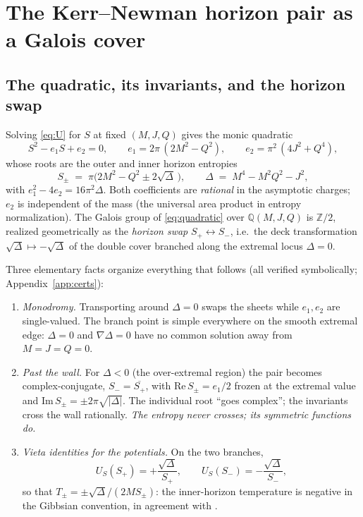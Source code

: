 \documentclass[11pt]{article}
\theoremstyle{definition}
\theoremstyle{remark}
\newcommand{\Q}{\mathbb{Q}}
\newcommand{\ZZ}{\mathbb{Z}}
\newcommand{\disc}{\Delta}
\begin{document}
\section{The Kerr--Newman horizon pair as a Galois cover}
\label{sec:KN}

\subsection{The quadratic, its invariants, and the horizon swap}

Solving \eqref{eq:U} for $S$ at fixed $(M,J,Q)$ gives the monic quadratic
\begin{equation}
S^2 - e_1 S + e_2 = 0,\qquad
e_1 = 2\pi\,(2M^2-Q^2),\qquad
e_2 = \pi^2\,(4J^2+Q^4),
\label{eq:quadratic}
\end{equation}
whose roots are the outer and inner horizon entropies
\begin{equation}
S_\pm \;=\; \pi\bigl(2M^2-Q^2 \pm 2\sqrt{\disc}\,\bigr),
\qquad \disc \;=\; M^4 - M^2Q^2 - J^2 ,
\end{equation}
with $e_1^2-4e_2 = 16\pi^2\disc$. Both coefficients are \emph{rational} in the
asymptotic charges; $e_2$ is independent of the mass (the universal area
product \cite{AH,CGP2011} in entropy normalization). The Galois group of
\eqref{eq:quadratic} over $\Q(M,J,Q)$ is $\ZZ/2$, realized geometrically as the
\emph{horizon swap} $S_+\leftrightarrow S_-$, i.e.\ the deck transformation
$\sqrt{\disc}\mapsto-\sqrt{\disc}$ of the double cover branched along the
extremal locus $\disc=0$.

Three elementary facts organize everything that follows (all verified
symbolically; Appendix~\ref{app:certs}):
\begin{enumerate}
\item \emph{Monodromy.} Transporting around $\disc=0$ swaps the sheets while
$e_1,e_2$ are single-valued. The branch point is simple everywhere on the
smooth extremal edge: $\disc=0$ and $\nabla\disc=0$ have no common solution
away from $M=J=Q=0$.
\item \emph{Past the wall.} For $\disc<0$ (the over-extremal region) the pair
becomes complex-conjugate, $S_-=\overline{S_+}$, with
$\mathrm{Re}\,S_\pm=e_1/2$ frozen at the extremal value and
$\mathrm{Im}\,S_\pm=\pm 2\pi\sqrt{|\disc|}$. The individual root
``goes complex''; the invariants cross the wall rationally. \emph{The entropy
never crosses; its symmetric functions do.}
\item \emph{Vieta identities for the potentials.} On the two branches,
\begin{equation}
U_S(S_+)=+\frac{\sqrt\disc}{S_+},\qquad
U_S(S_-)=-\frac{\sqrt\disc}{S_-},
\end{equation}
so that $T_\pm = \pm\sqrt{\disc}/(2MS_\pm)$: the inner-horizon temperature is
negative in the Gibbsian convention, in agreement with \cite{CGLP2018}.
\end{enumerate}
\end{document}
